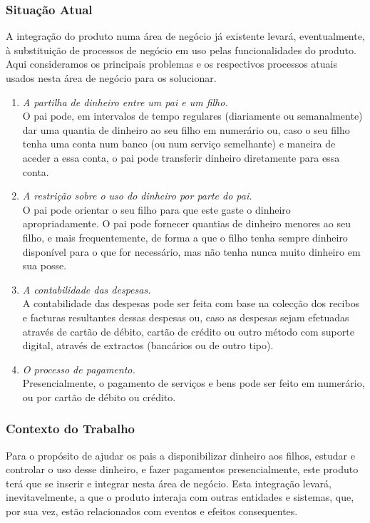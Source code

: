 \documentclass{article}
\begin{document}
    \subsubsection{Situação Atual}
      A integração do produto numa área de negócio já existente levará, eventualmente, à substituição de processos de negócio em uso pelas funcionalidades do produto. Aqui consideramos os principais problemas e os respectivos processos atuais usados nesta área de negócio para os solucionar.

      \begin{enumerate}
        \item \emph{A partilha de dinheiro entre um pai e um filho.}\\
          O pai pode, em intervalos de tempo regulares (diariamente ou semanalmente) dar uma quantia de dinheiro ao seu filho em numerário ou, caso o seu filho tenha uma conta num banco (ou num serviço semelhante) e maneira de aceder a essa conta, o pai pode transferir dinheiro diretamente para essa conta.
        \item \emph{A restrição sobre o uso do dinheiro por parte do pai.}\\
          O pai pode orientar o seu filho para que este gaste o dinheiro apropriadamente. O pai pode fornecer quantias de dinheiro menores ao seu filho, e mais frequentemente, de forma a que o filho tenha sempre dinheiro disponível para o que for necessário, mas não tenha nunca muito dinheiro em sua posse.
        \item\emph{ A contabilidade das despesas.}\\
          A contabilidade das despesas pode ser feita com base na colecção dos recibos e facturas resultantes dessas despesas ou, caso as despesas sejam efetuadas através de cartão de débito, cartão de crédito ou outro método com suporte digital, através de extractos (bancários ou de outro tipo).
        \item  \emph{O processo de pagamento.}\\
       Presencialmente, o pagamento de serviços e bens pode ser feito em numerário, ou por cartão de débito ou crédito.
      \end{enumerate}

    \subsubsection{Contexto do Trabalho}
      
      Para o propósito de ajudar os pais a disponibilizar dinheiro aos filhos, estudar e controlar o uso desse dinheiro, e fazer pagamentos presencialmente, este produto terá que se inserir e integrar nesta área de negócio. Esta integração levará, inevitavelmente, a que o produto interaja com outras entidades e sistemas, que, por sua vez, estão relacionados com eventos e efeitos consequentes.
\end{document}

